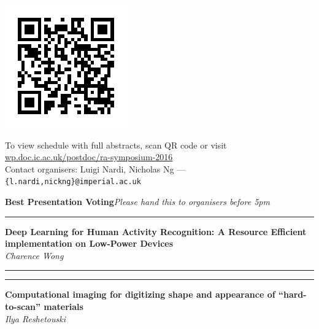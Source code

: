 \documentclass[11pt]{article}
\newcommand{\talk}[1]{\Large\flushleft\textbf{#1}\\}
\newcommand{\speaker}[1]{\textit{#1}\\}
\newcommand{\separator}{\noindent\rule{\linewidth}{0.1mm}}
\newcommand{\hstrut}{\noindent\color{iclightblue}\rule{\linewidth}{0pt}}
\begin{document}
\vfill
\noindent
\begin{minipage}{0.15\linewidth}
  \includegraphics[width=\linewidth]{qr.png}
\end{minipage}
\begin{minipage}{0.85\linewidth}
\large
\flushright%
To view schedule with full abstracts, scan QR code or visit
\href{http://wp.doc.ic.ac.uk/postdoc/ra-symposium-2016}
     {wp.doc.ic.ac.uk/postdoc/ra-symposium-2016}
\\[0.5cm]
{\small Contact organisers: Luigi Nardi, Nicholas Ng --- \texttt{\{l.nardi,nickng\}@imperial.ac.uk}}
\end{minipage}
\clearpage
\noindent
\textbf{\flushleft\LARGE\color{icdarkblue}Best Presentation Voting}\hfill\textit{Please hand this to organisers before 5pm}\\
\noindent
\begin{minipage}[t]{0.49\linewidth}
\separator%
\talk{Deep Learning for Human Activity Recognition: A Resource Efficient
      implementation on Low-Power Devices}
\speaker{Charence Wong}
\end{minipage}
\begin{minipage}[t]{0.02\linewidth}
\hstrut%
\end{minipage}
\begin{minipage}[t]{0.49\linewidth}
\separator%
\talk{Computational imaging for digitizing shape and appearance of
      ``hard-to-scan'' materials}
\speaker{Ilya Reshetouski}
\end{minipage}
\end{document}
